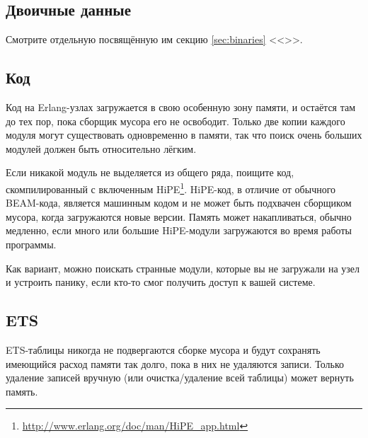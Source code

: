 \documentclass[11pt, oneside]{book}   	%
\newcommand\NamedRef[1]{\ref{#1} <<\nameref{#1}>>}
\begin{document}
\subsection{Двоичные данные}

Смотрите отдельную посвящённую им секцию \NamedRef{sec:binaries}.


\subsection{Код}

Код на Erlang-узлах загружается в свою особенную зону памяти, и остаётся там до тех пор, пока сборщик мусора его не освободит. Только две копии каждого модуля могут существовать одновременно в памяти, так что поиск очень больших модулей должен быть относительно лёгким.

Если никакой модуль не выделяется из общего ряда, поищите код, скомпилированный с включенным HiPE\footnote{\href{http://www.erlang.org/doc/man/HiPE\_app.html}{http://www.erlang.org/doc/man/HiPE\_app.html}}. HiPE-код, в отличие от обычного BEAM-кода, является машинным кодом и не может быть подхвачен сборщиком мусора, когда загружаются новые версии. Память может накапливаться, обычно медленно, если много или большие HiPE-модули загружаются во время работы программы.

Как вариант, можно поискать странные модули, которые вы не загружали на узел и устроить панику, если кто-то смог получить доступ к вашей системе.


\subsection{ETS}

ETS-таблицы никогда не подвергаются сборке мусора и будут сохранять имеющийся расход памяти так долго, пока в них не удаляются записи. Только удаление записей вручную (или очистка/удаление всей таблицы) может вернуть память.
\end{document}
